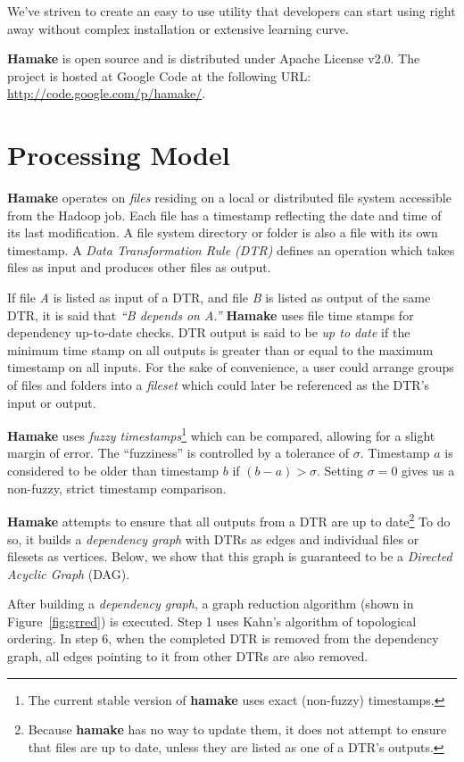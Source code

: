 \documentclass[10pt,conference,letterpaper]{IEEEtran}
\begin{document}
We've striven to create an easy to use utility that developers can
start using right away without complex installation or extensive
learning curve. 

\textbf{Hamake} is open source and is distributed under Apache
License v2.0. The project is hosted at Google Code at the following
URL: \url{http://code.google.com/p/hamake/}.

\section{Processing Model}

\textbf{Hamake} operates on \textit{files} residing on a local or
distributed file system accessible from the Hadoop job. Each file has a timestamp reflecting the date and time of its
last modification. A file system directory or folder is also a file
with its own timestamp. A \textit{Data Transformation Rule (DTR)}
defines an operation which takes files as input and produces other
files as output.

If file \textit{A} is listed as input of a DTR, and file \textit{B}
is listed as output of the same DTR, it is said that \textit{``B depends
  on A.''} \textbf{Hamake} uses file time stamps for dependency
up-to-date checks. DTR output is said to be \textit{up to date} if the minimum time stamp on all outputs is greater than or equal to the maximum timestamp on all inputs. For the sake of convenience, a user could arrange groups of files and folders into a \emph{fileset} which could later be referenced as the DTR's input or output.

\textbf{Hamake} uses \textit{fuzzy timestamps}\footnote{The current stable
  version of \textbf{hamake} uses exact (non-fuzzy) timestamps.}
which can be compared, allowing for a slight margin of error. The
``fuzziness'' is controlled by a tolerance of $\sigma$. Timestamp $a$ is considered to be older than timestamp $b$ if $(b-a)>\sigma$. Setting $\sigma=0$ gives us a non-fuzzy, strict timestamp comparison.

\textbf{Hamake} attempts to ensure that all outputs from a DTR are up to
date\footnote{Because \textbf{hamake} has no way to update them, it does not attempt to ensure that files are up to date, unless they are listed as one of a DTR's outputs.} To do so, it builds a \textit{dependency graph} with DTRs as edges and individual files or filesets as vertices. Below, we show that this graph is guaranteed to be a \textit{Directed Acyclic Graph} (DAG).

After building a \textit{dependency graph}, a graph reduction algorithm (shown in Figure~\ref{fig:grred}) is executed. Step 1 uses Kahn's algorithm\cite{kahn1962topological} of topological ordering. In step 6, when the completed DTR is removed from the dependency graph, all edges pointing to it from other DTRs are also removed.
\end{document}
